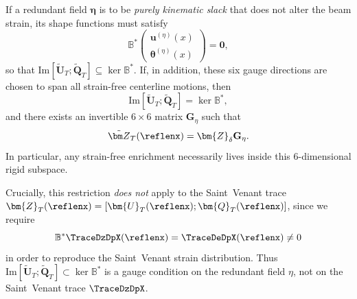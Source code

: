 If a redundant field $\bm{\eta}$ is to be \emph{purely kinematic slack} that does not alter the beam strain, its shape functions must satisfy
\[
  \mathbb{B}^*
  \begin{pmatrix}
    \bm{u}^{(\eta)}(x)\\[2pt] \bm{\theta}^{(\eta)}(x)
  \end{pmatrix} = \mathbf{0},
\]
so that $\mathrm{Im}[\tilde{\bm U}_T;\tilde{\bm Q}_T]\subseteq\ker\mathbb{B}^*$. If, in addition, these six gauge directions are chosen to span all strain-free centerline motions, then
\[
  \mathrm{Im}[\tilde{\bm U}_T;\tilde{\bm Q}_T]=\ker\mathbb{B}^*,
\]
and there exists an invertible $6\times6$ matrix $\mathbf{G}_\eta$ such that
\[
   \tilde{\bm Z}_T(\reflenx)
  =
  \bm{Z}_{\delta}\mathbf{G}_\eta.
\]
In particular, any strain-free enrichment necessarily lives inside this $6$-dimensional rigid subspace.

Crucially, this restriction \emph{does not} apply to the Saint~Venant trace $\bm{Z}_T(\reflenx)=[\bm{U}_T(\reflenx);\bm{Q}_T(\reflenx)]$, since we require
\[
  \mathbb{B}^* \TraceDzDpX(\reflenx) = \TraceDeDpX(\reflenx)\neq 0
\]
in order to reproduce the Saint~Venant strain distribution. Thus
$\mathrm{Im}[\tilde{\bm U}_T;\tilde{\bm Q}_T]\subset\ker\mathbb{B}^*$ is a gauge condition on the redundant field $\eta$, not on the Saint~Venant trace $\TraceDzDpX$.
